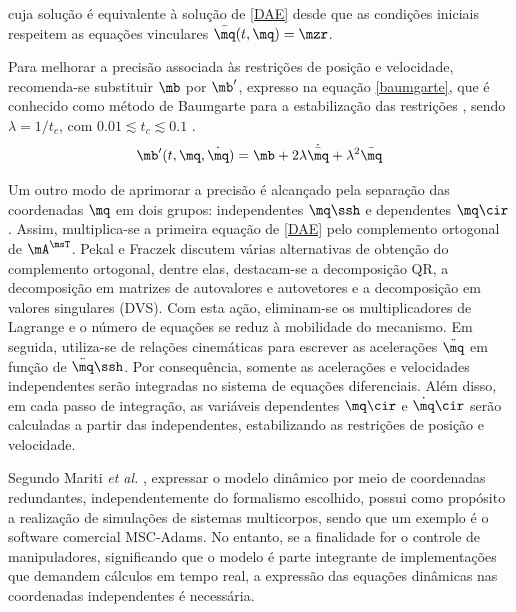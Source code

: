 \documentclass[]{politex}
\begin{document}
cuja solução é equivalente à solução de \eqref{DAE} desde que as condições iniciais respeitem as equações vinculares $\bar{\mq}(t, \mq) = \mzr$.

Para melhorar a precisão associada às restrições de posição e velocidade, recomenda-se substituir $\mb$ por $\mb'$, expresso na equação \eqref{baumgarte}, que é conhecido como método de Baumgarte para a estabilização das restrições \cite{Baumgarte, Featherstone, Nikravesh}, sendo $\lambda = 1/t_c$, com  $0.01 \lesssim t_c \lesssim 0.1 $ \cite{Featherstone}. 
%
\begin{equation}
\mb'(t,\mq,\dot{\mq}) = \mb + 2\lambda \dot{\bar{\mq}} + \lambda^2 \bar{\mq}
\label{baumgarte}
\end{equation}


Um outro modo de aprimorar a precisão é alcançado pela separação das coordenadas $\mq$ em dois grupos: independentes $\mq\ssh$ e dependentes $\mq\cir$. Assim, multiplica-se a primeira equação de \eqref{DAE} pelo complemento ortogonal \cite{Kordjazi} de $\mA^\msT$. Pekal e Fraczek \cite{Pekal} discutem várias alternativas de obtenção do complemento ortogonal, dentre elas, destacam-se a decomposição QR, a decomposição em matrizes de autovalores e autovetores e a decomposição em valores singulares (DVS). Com esta ação, eliminam-se os multiplicadores de Lagrange e o número de equações se reduz à mobilidade do mecanismo. Em seguida, utiliza-se de relações cinemáticas para  escrever as acelerações $\ddot{\mq}$ em função de $\ddot{\mq}\ssh$. Por consequência, somente as acelerações e velocidades independentes serão integradas no sistema de equações diferenciais. Além disso, em cada passo de integração, as variáveis dependentes $\mq\cir$ e $\dot{\mq}\cir$ serão calculadas a partir das independentes, estabilizando as restrições de posição e velocidade.


Segundo Mariti \emph{et al.} \cite{Mariti}, expressar o modelo dinâmico por meio de coordenadas redundantes, independentemente do formalismo escolhido, possui como propósito a realização de simulações de sistemas multicorpos, sendo que um exemplo é o software comercial MSC-Adams. No entanto, se a finalidade for o controle de manipuladores, significando que o modelo é parte integrante de implementações que demandem  cálculos em tempo real, a expressão das equações dinâmicas nas coordenadas independentes é necessária.
\end{document}
